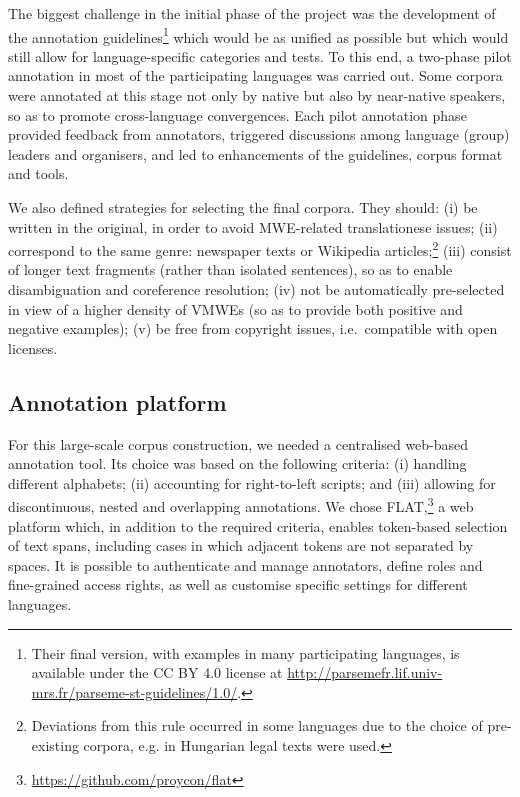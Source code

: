 \documentclass[output=paper,modfonts]{langscibook}
\begin{document}
The biggest challenge in the initial phase of the project was the development of the annotation guidelines\footnote{Their final version, with examples in many participating languages, is available under the CC BY 4.0 license at %
\url{http://parsemefr.lif.univ-mrs.fr/parseme-st-guidelines/1.0/}.} which would be as unified as possible but which would still allow for language-specific categories and tests. To this end, a two-phase pilot annotation in most of the participating languages was carried out. Some corpora were annotated at this stage not only by native but also by near-native speakers, so as to promote cross-language convergences. Each pilot annotation phase provided feedback from annotators, triggered discussions among language (group) leaders and organisers, and led to enhancements of the guidelines, corpus format and tools. 

We also defined strategies for selecting the final corpora. They should: (i) be written in the original, 
 in order to avoid  MWE-related translationese issues; (ii) correspond to the same genre: newspaper texts or Wikipedia articles;\footnote{Deviations from this rule occurred in some languages due to the choice of pre-existing corpora, e.g. in Hungarian legal texts were used.} (iii) consist of longer text fragments (rather than isolated sentences), so as to enable disambiguation and coreference resolution; (iv) not be automatically pre-selected in view of a higher density of VMWEs (so as to provide both positive and negative examples); (v) be free from copyright issues, i.e.\ compatible with open licenses. 

\subsection{Annotation platform}
\label{sec:flat}
%
For this large-scale corpus construction, we needed a centralised web-based annotation tool. Its choice was based on the
following criteria: (i) handling different alphabets; (ii) accounting for right-to-left scripts; and (iii) allowing for
discontinuous, nested and overlapping annotations. We chose
FLAT,\footnote{\scriptsize\url{https://github.com/proycon/flat}} a web platform which, in addition to the required criteria, enables token-based selection of text spans,
including cases in which adjacent tokens are not separated by spaces. It is possible to authenticate and manage
annotators, define roles and fine-grained access rights, as well as customise specific settings for different languages.
\end{document}
